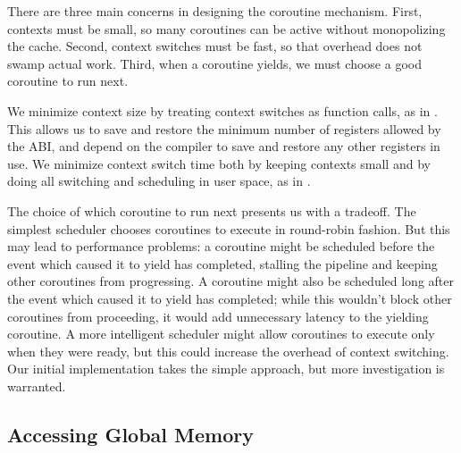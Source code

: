 \documentclass{acm_proc_article-sp}
\begin{document}
There are three main concerns in designing the coroutine
mechanism. First, contexts must be small, so many coroutines can be
active without monopolizing the cache. Second, context switches must
be fast, so that overhead does not swamp actual work. Third, when a
coroutine yields, we must choose a good coroutine to run next.

We minimize context size by treating context switches as function
calls, as in \cite{charm}. This allows us to save and restore the
minimum number of registers allowed by the ABI, and depend on the
compiler to save and restore any other registers in use. We minimize
context switch time both by keeping contexts small and by doing all
switching and scheduling in user space, as in .

The choice of which coroutine to run next presents us with a
tradeoff. The simplest scheduler chooses coroutines to execute in
round-robin fashion. But this may lead to performance problems: a
coroutine might be scheduled before the event which caused it to yield
has completed, stalling the pipeline and keeping other coroutines from
progressing. A coroutine might also be scheduled long after the event
which caused it to yield has completed; while this wouldn't block
other coroutines from proceeding, it would add unnecessary latency to
the yielding coroutine. A more intelligent scheduler might allow
coroutines to execute only when they were ready, but this could
increase the overhead of context switching. Our initial implementation
takes the simple approach, but more investigation is warranted.

\subsection{Accessing Global Memory}




\end{document}
